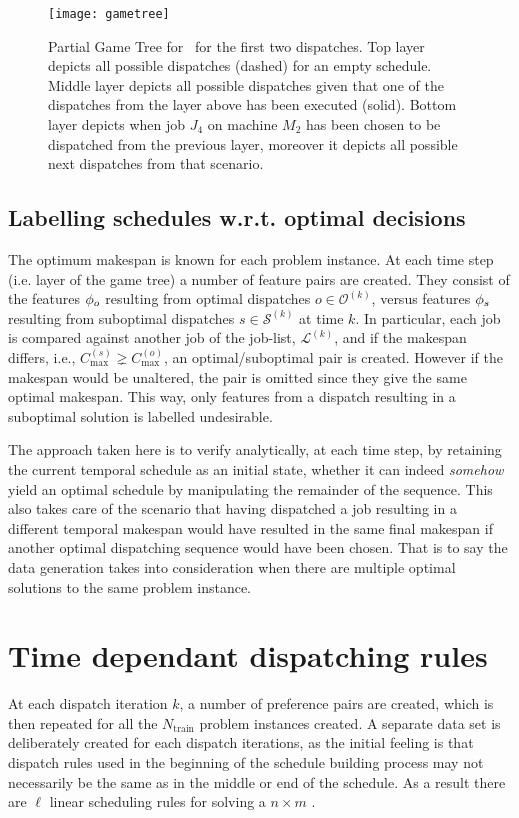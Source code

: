 \begin{figure}
	\texttt{[image: gametree]}
	\caption[Partial Game Tree for \jsp]{Partial Game Tree for \jsp\ for the first two dispatches. 
		Top layer depicts all possible dispatches (dashed) for an empty schedule. 
		Middle layer depicts all possible dispatches given that one of the dispatches from the layer above has been executed (solid). 
	Bottom layer depicts when job $J_4$ on machine $M_2$ has been chosen to be dispatched from the previous layer, moreover it depicts all possible next dispatches from that scenario.}
	\label{fig:jssp:gametree}
\end{figure}

\subsection{Labelling schedules w.r.t. optimal decisions}\label{sec:gentrdat:labelling}
The optimum makespan is known for each problem instance. 
At each time step (i.e. layer of the game tree) a number of feature pairs are created. 
They consist of the features ${\mathbf{\phi}}_o$ resulting from optimal dispatches $o\in\mathcal{O}^{(k)}$, versus features ${\mathbf{\phi}}_s$ resulting from suboptimal dispatches $s\in\mathcal{S}^{(k)}$ at time $k$. 
In particular, each job is compared against another job of the job-list, 
$\mathcal{L}^{(k)}$, and if the makespan differs, i.e., $C_{\max}^{(s)}\gneq 
C_{\max}^{(o)}$, an optimal/suboptimal pair is created. 
However if the makespan would be unaltered, the pair is omitted since they give the same optimal makespan. 
This way, only features from a dispatch resulting in a suboptimal solution is labelled undesirable.

The approach taken here is to verify analytically, at each time step, by retaining the current temporal schedule as an initial state, whether it can indeed \emph{somehow} yield an optimal schedule by manipulating the remainder of the sequence. 
This also takes care of the scenario that having dispatched a job resulting in a different temporal makespan would have resulted in the same final makespan if another optimal dispatching sequence would have been chosen. 
That is to say the data generation takes into consideration when there are multiple optimal solutions to the same problem instance. 

\section{Time dependant dispatching rules}
At each dispatch iteration $k$, a number of preference pairs are created, which is then repeated for all the $N_{\text{train}}$ problem instances created. 
A separate data set is deliberately created for each dispatch iterations, as the initial feeling is that dispatch rules used in the beginning of the schedule building process may not necessarily be the same as in the middle or end of the schedule. As a result there are $\ell$ linear scheduling rules for solving a $n \times m$ \jsp. 

